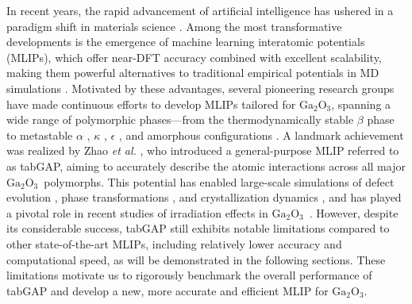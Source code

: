 \documentclass[%
reprint,
superscriptaddress,
 amsmath,amssymb,
 aps,
]{revtex4-2}
\newcommand{\ga}{$\text{Ga}_2\text{O}_3$}
\begin{document}
In recent years, the rapid advancement of artificial intelligence has ushered in a 
paradigm shift in materials science \cite{pyzer-knapp_accelerating_2022}. 
Among the most transformative developments is the emergence of machine learning interatomic 
potentials (MLIPs), which offer near-DFT accuracy combined with excellent scalability, 
making them powerful alternatives to traditional empirical potentials 
in MD simulations \cite{ko_recent_2023}. 
Motivated by these advantages, several pioneering research groups have made 
continuous efforts to develop MLIPs tailored for \ga, spanning a wide range of polymorphic 
phases---from the thermodynamically stable $\beta$ phase \cite{li_deep_2020,liu_machine_2020,zhao_phase_2021} 
to metastable $\alpha$ \cite{sun_neuroevolution_2023}, $\kappa$ \cite{wang_dissimilar_2024}, 
$\epsilon$ \cite{sun_neuroevolution_2023}, and amorphous configurations \cite{liu_unraveling_2023}. 
A landmark achievement was realized by Zhao \textit{et al.} \cite{zhao_complex_2023}, 
who introduced a general-purpose MLIP referred to as tabGAP, aiming to accurately 
describe the atomic interactions across all major \ga\ polymorphs. 
This potential has enabled large-scale simulations of 
defect evolution \cite{he_threshold_2024,he_ultrahigh_2024,liu_orientation-dependent_2025}, 
phase transformations \cite{azarov_self-assembling_2025}, 
and crystallization dynamics \cite{zhang_orientation-dependent_2023,li_edge-dependent_2025}, 
and has played a pivotal role in recent studies of irradiation effects in 
\ga\ \cite{azarov_universal_2023,zhao_crystallization_2025,han_electronic_2025,abdullaev_ions_2025}.
However, despite its considerable success, tabGAP still exhibits notable limitations compared 
to other state-of-the-art MLIPs, including relatively lower accuracy and computational 
speed, as will be demonstrated in the following sections. 
These limitations motivate us to rigorously benchmark the overall 
performance of tabGAP and develop a new, more accurate and efficient MLIP for \ga.
\end{document}
